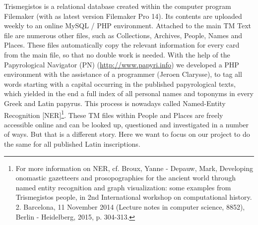 \documentclass[amsthm,ebook]{saparticle}
\begin{document}
 Trismegistos is a relational database created within the computer program Filemaker (with as latest version
Filemaker Pro 14). Its contents are uploaded weekly to an online MySQL / PHP environment. Attached to the main TM Text
file are numerous other files, such as Collections, Archives, People, Names and Places. These files automatically copy
the relevant information for every card from the main file, so that no double work is needed. With the help of the
Papyrological Navigator (PN) (\url{http://www.papyri.info}) we developed a PHP environment with the assistance of a
programmer (Jeroen Clarysse), to tag all words starting with a capital occurring in the published papyrological texts,
which yielded in the end a full index of all personal names and toponyms in every Greek and Latin papyrus. This process
is nowadays called Named-Entity Recognition [NER]\footnote{ For more information on NER, cf. Broux, Yanne - Depauw,
Mark, Developing onomastic gazetteers and prosopographies for the ancient world through named entity recognition and
graph visualization: some examples from Trismegistos people, in 2nd International workshop on computational history. 2.
Barcelona, 11 November 2014 (Lecture notes in computer science, 8852), Berlin - Heidelberg, 2015, p. 304-313.}. These
TM files within People and Places are freely accessible online and can be looked up, questioned and investigated in a
number of ways. But that is a different story. Here we want to focus on our project to do the same for all published
Latin inscriptions.
\end{document}
